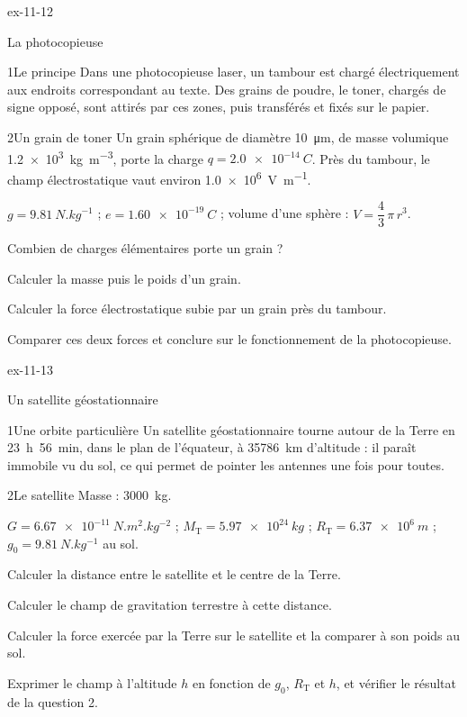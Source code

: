 \begin{blocLivre}{ex-11-12}
\begin{exercice}[3]{La photocopieuse}
\begin{docu}{1}{Le principe}
Dans une photocopieuse laser, un tambour est chargé électriquement aux endroits correspondant au texte. Des grains de
poudre, le toner, chargés de signe opposé, sont attirés par ces zones, puis transférés et fixés sur le papier.
\end{docu}
\begin{docu}{2}{Un grain de toner}
Un grain sphérique de diamètre \qty{10}{\micro m}, de masse volumique \qty{1,2e3}{kg.m^{-3}}, porte la charge $q=\qty{2,0e-14}{C}$. Près du tambour, le
champ électrostatique vaut environ \qty{1,0e6}{V.m^{-1}}.
\end{docu}
\begin{donnees}
$g=\qty{9,81}{N.kg^{-1}}$ ; $e=\qty{1,60e-19}{C}$ ; volume d'une sphère : $V=\dfrac{4}{3}\,\pi\,r^3$.
\end{donnees}
\begin{questions}
\item Combien de charges élémentaires porte un grain ?
\item Calculer la masse puis le poids d'un grain.
\item Calculer la force électrostatique subie par un grain près du tambour.
\item \initiative Comparer ces deux forces et conclure sur le fonctionnement de la photocopieuse.
\end{questions}
\end{exercice}
\end{blocLivre}
\begin{blocLivre}{ex-11-13}
\begin{exercice}[3]{Un satellite géostationnaire}
\begin{docu}{1}{Une orbite particulière}
Un satellite géostationnaire tourne autour de la Terre en 23~h~56~min, dans le plan de l'équateur, à \qty{35786}{km} d'altitude :
il paraît immobile vu du sol, ce qui permet de pointer les antennes une fois pour toutes.
\end{docu}
\begin{docu}{2}{Le satellite}
Masse : \qty{3000}{kg}.
\end{docu}
\begin{donnees}
$G=\qty{6,67e-11}{N.m^2.kg^{-2}}$ ; $M_\mathrm{T}=\qty{5,97e24}{kg}$ ; $R_\mathrm{T}=\qty{6,37e6}{m}$ ; $g_0=\qty{9,81}{N.kg^{-1}}$ au sol.
\end{donnees}
\begin{questions}
\item Calculer la distance entre le satellite et le centre de la Terre.
\item Calculer le champ de gravitation terrestre à cette distance.
\item Calculer la force exercée par la Terre sur le satellite et la comparer à son poids au sol.
\item \initiative Exprimer le champ à l'altitude $h$ en fonction de $g_0$, $R_\mathrm{T}$ et $h$, et vérifier le résultat de la question 2.
\end{questions}
\end{exercice}
\end{blocLivre}
